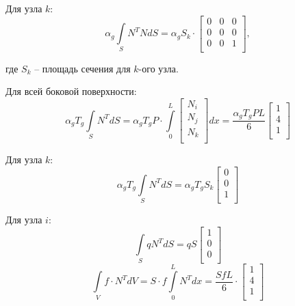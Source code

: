 \begin{center}
\end{center}

Для узла $k$:
\[\alpha_g \int \limits_S N^T N dS = \alpha_g S_k 
\cdot \begin{bmatrix}
0 & 0 & 0 \\
0 & 0 & 0 \\
0 & 0 & 1 \\
\end{bmatrix},\]

где $S_k$ -- площадь сечения для $k$-ого узла.

Для всей боковой поверхности:
\[\alpha_g T_g \int \limits_S N^T dS = \alpha_g T_g P \cdot \int \limits_0^L 
\begin{bmatrix}
N_i \\
N_j \\
N_k \\
\end{bmatrix} dx = 
\frac{\alpha_g T_g P L}{6}
\begin{bmatrix}
1 \\
4 \\
1 \\
\end{bmatrix} \]

Для узла $k$:
\[\alpha_g T_g \int \limits_S N^T dS = \alpha_g T_g S_k 
\begin{bmatrix}
0 \\
0 \\
1 \\
\end{bmatrix} 
\]

Для узла $i$:
\[
\int \limits_S q N^T dS = qS
\begin{bmatrix}
1 \\
0 \\
0 \\
\end{bmatrix} 
\]
\[
\int \limits_V f \cdot N^T dV = S \cdot f \int \limits_0^L N^T dx = \frac{SfL}{6} \cdot
\begin{bmatrix}
1 \\
4 \\
1 \\
\end{bmatrix}
\]

